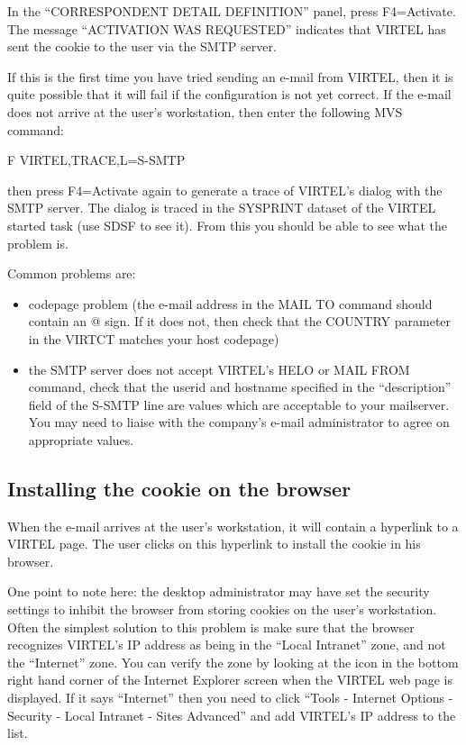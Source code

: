 \documentclass[letterpaper,10pt,english]{sphinxmanual}
\begin{document}
In the “CORRESPONDENT DETAIL DEFINITION” panel, press F4=Activate. The message “ACTIVATION WAS REQUESTED” indicates that VIRTEL has sent the cookie to the user via the SMTP server.

If this is the first time you have tried sending an e-mail from VIRTEL, then it is quite possible that it will fail if the configuration is not yet correct.  If the e-mail does not arrive at the user’s workstation, then enter the following MVS command:

F VIRTEL,TRACE,L=S-SMTP

then press F4=Activate again to generate a trace of VIRTEL’s dialog with the SMTP server.  The dialog is traced in the SYSPRINT dataset of the VIRTEL started task (use SDSF to see it). From this you should be able to see what the problem is.

Common problems are:
\begin{itemize}
\item {} 
codepage problem (the e-mail address in the MAIL TO command should contain an @ sign. If it does not, then check that the COUNTRY parameter in the VIRTCT matches your host codepage)

\item {} 
the SMTP server does not accept VIRTEL’s HELO or MAIL FROM command, check that the userid and hostname specified in the “description” field of the S-SMTP line are values which are acceptable to your mailserver.  You may need to liaise with the company’s e-mail administrator to agree on appropriate values.

\end{itemize}


\subsection{Installing the cookie on the browser}
\label{\detokenize{connectivity_guide:installing-the-cookie-on-the-browser}}
When the e-mail arrives at the user’s workstation, it will contain a hyperlink to a VIRTEL page.  The user clicks on this hyperlink to install the cookie in his browser.

One point to note here: the desktop administrator may have set the security settings to inhibit the browser from storing cookies on the user’s workstation.  Often the simplest solution to this problem is make sure that the browser recognizes VIRTEL’s IP address as being in the “Local Intranet” zone, and not the “Internet” zone.  You can verify the zone by looking at the icon in the bottom right hand corner of the Internet Explorer screen when the VIRTEL web page is displayed.  If it says “Internet” then you need to click “Tools - Internet Options - Security - Local Intranet - Sites \textendash{} Advanced” and add VIRTEL’s IP address to the list.
\end{document}
